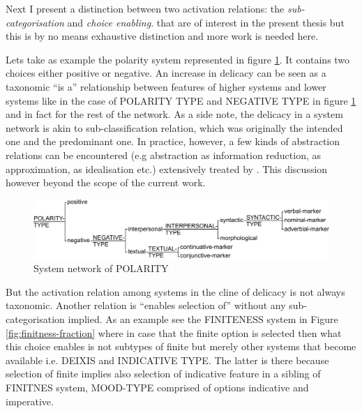 Next I present a distinction between two activation relations: the \textit{sub-categorisation} and \textit{choice enabling}. that are of interest in the present thesis but this is by no means exhaustive distinction and more work is needed here.

Lets take as example the polarity system represented in figure \ref{fig:polarity}. It contains two choices either positive or negative. 
An increase in delicacy can be seen as a taxonomic ``is a'' relationship between features of higher systems and lower systems like in the case of POLARITY TYPE and NEGATIVE TYPE in figure \ref{fig:polarity} and in fact for the rest of the network. 
As a side note, the delicacy in a system network is akin to sub-classification relation, which was originally the intended one and the predominant one. In practice, however, a few kinds of abstraction relations can be encountered (e.g abstraction as information reduction, as approximation, as idealisation etc.) extensively treated by \citet{Saitta2013}. This discussion however beyond the scope of the current work.

\begin{figure}[H]
    \centering
    \includegraphics[width=\textwidth]{Figures/SFL-grammar/polarity-system.pdf}
    \caption{System network of POLARITY}
    \label{fig:polarity}
\end{figure}

But the activation relation among systems in the cline of delicacy is not always taxonomic. Another relation is ``enables selection of'' without any sub-categorisation implied. As an example see the FINITENESS system in Figure \ref{fig:finitness-fraction} where in case that the finite option is selected then what this choice enables is not subtypes of finite but merely other systems that become available i.e. DEIXIS and INDICATIVE TYPE. The latter is there because selection of finite implies also selection of indicative feature in a sibling of FINITNES system, MOOD-TYPE comprised of options indicative and imperative.

